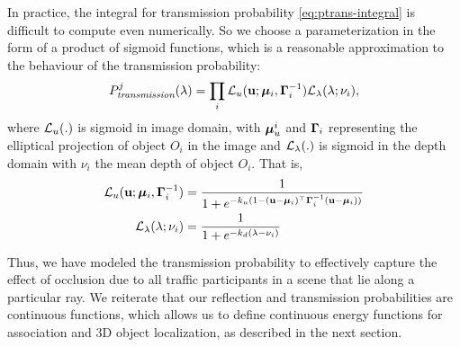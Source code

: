 In practice, the integral for transmission probability \eqref{eq:ptrans-integral} is difficult to compute even numerically. So we choose a parameterization in the form of a product of sigmoid functions, which is a reasonable approximation to the behaviour of the transmission probability:
%
\begin{align}
P^j_{\textit{transmission}}(\lambda) = \prod_i \mathcal{L}_u (\mathbf{u}; {\bm{\mu}}_i, \bm{\Gamma}_i^{-1}) \mathcal{L}_{\lambda}(\lambda; \nu_i),
\label{eq:evalCumulativePtrans}
\end{align}
%
where $\mathcal{L}_u(.)$ is sigmoid in image domain, with ${\bm{\mu}}^i_u$ and $\bm{\Gamma}_i$ representing the elliptical projection of object $O_i$ in the image and $\mathcal{L}_{\lambda}(.)$ is sigmoid in the depth domain with $\nu_i$ the mean depth of object $O_i$. That is,
%
\begin{align}
\mathcal{L}_u(\mathbf{u}; {\bm{\mu}}_i, \bm{\Gamma}_i^{-1}) &= \frac{1}{1 + e^{-k_u(1 - (\mathbf{u} - {\bm{\mu}}_i)^\top \bm{\Gamma}_i^{-1} (\mathbf{u} - {\bm{\mu}}_i))}} \\
\mathcal{L}_{\lambda}(\lambda; \nu_i) &= \frac{1}{1 + e^{-k_d(\lambda - \nu_i)}}
\end{align}
%

Thus, we have modeled the transmission probability to effectively capture the effect of occlusion due to all traffic participants in a scene that lie along a particular ray. We reiterate that our reflection and transmission probabilities are continuous functions, which allows us to define continuous energy functions for association and 3D object localization, as described in the next section.






